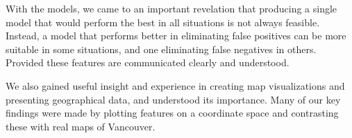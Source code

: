 With the models, we came to an important revelation that producing a single model that would perform the best in all situations is not always feasible. Instead, a model that performs better in eliminating false positives can be more suitable in some situations, and one eliminating false negatives in others. Provided these features are communicated clearly and understood.

We also gained useful insight and experience in creating map visualizations and presenting geographical data, and understood its importance. Many of our key findings were made by plotting features on a coordinate space and contrasting these with real maps of Vancouver.


